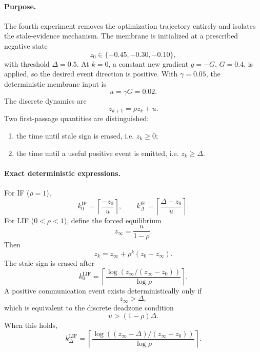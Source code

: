 \paragraph{Purpose.}
The fourth experiment removes the optimization trajectory entirely and isolates the stale-evidence mechanism. The membrane is initialized at a prescribed negative state
\begin{equation}
  z_0\in\{-0.45,-0.30,-0.10\},
\end{equation}
with threshold $\Delta=0.5$. At $k=0$, a constant new gradient $g=-G$, $G=0.4$, is applied, so the desired event direction is positive. With $\gamma=0.05$, the deterministic membrane input is
\begin{equation}
  u=\gamma G=0.02.
\end{equation}
The discrete dynamics are
\begin{equation}
  z_{k+1}=\rho z_k+u.
\end{equation}
Two first-passage quantities are distinguished:
\begin{enumerate}
  \item the time until stale sign is erased, i.e. $z_k\geq0$;
  \item the time until a useful positive event is emitted, i.e. $z_k\geq\Delta$.
\end{enumerate}

\paragraph{Exact deterministic expressions.}
For IF ($\rho=1$),
\begin{equation}
  k_0^{\mathrm{IF}}=\left\lceil\frac{-z_0}{u}\right\rceil,
  \qquad
  k_\Delta^{\mathrm{IF}}=\left\lceil\frac{\Delta-z_0}{u}\right\rceil.
\end{equation}
For LIF ($0<\rho<1$), define the forced equilibrium
\begin{equation}
  z_\infty=\frac{u}{1-\rho}.
\end{equation}
Then
\begin{equation}
  z_k=z_\infty+\rho^k(z_0-z_\infty).
\end{equation}
The stale sign is erased after
\begin{equation}
  k_0^{\mathrm{LIF}}
  =\left\lceil
  \frac{\log\!\left(z_\infty/(z_\infty-z_0)\right)}{\log\rho}
  \right\rceil.
\end{equation}
A positive communication event exists deterministically only if
\begin{equation}
  z_\infty>\Delta,
\end{equation}
which is equivalent to the discrete deadzone condition
\begin{equation}
  u>(1-\rho)\Delta.
\end{equation}
When this holds,
\begin{equation}
  k_\Delta^{\mathrm{LIF}}
  =\left\lceil
  \frac{\log\!\left((z_\infty-\Delta)/(z_\infty-z_0)\right)}{\log\rho}
  \right\rceil.
\end{equation}

